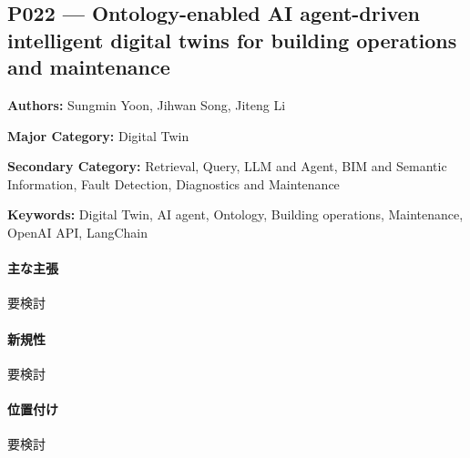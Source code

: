 \subsection{P022 --- Ontology-enabled AI agent-driven intelligent digital twins for building operations and maintenance}
\label{paper:P022}
\textbf{Authors:} Sungmin Yoon, Jihwan Song, Jiteng Li\par
\textbf{Major Category:} Digital Twin\par
\textbf{Secondary Category:} Retrieval, Query, LLM and Agent, BIM and Semantic Information, Fault Detection, Diagnostics and Maintenance\par
\textbf{Keywords:} Digital Twin, AI agent, Ontology, Building operations, Maintenance, OpenAI API, LangChain\par
\paragraph{主な主張}
要検討 \cite{Yoon:2025OntologyAIDT}
\paragraph{新規性}
要検討
\paragraph{位置付け}
要検討
